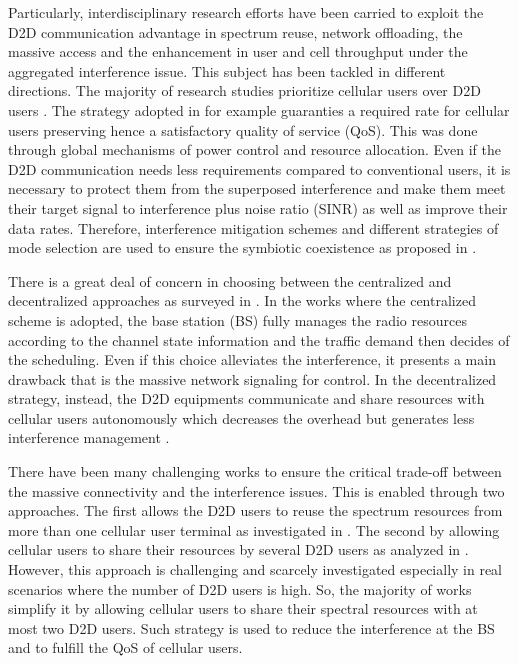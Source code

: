 \documentclass[conference,onecolumn,12pt]{IEEEtran}
\begin{document}
Particularly, interdisciplinary research efforts have been carried to exploit the D2D communication advantage in spectrum reuse, network offloading, the massive access and the enhancement in user and cell throughput under the aggregated interference issue. This subject has been tackled in different directions. The majority of research studies prioritize cellular users over D2D users \cite{D2DqosSurvey}. The strategy adopted in \cite{RateQos} for example guaranties a required rate for cellular users preserving hence a satisfactory quality of service (QoS). This was done through global mechanisms of power control and resource allocation. Even if the D2D communication needs less requirements compared to conventional users, it is necessary to protect them from the superposed interference and make them meet their target signal to interference plus noise ratio (SINR) as well as improve their data rates. Therefore, interference mitigation schemes and different strategies of mode selection are used to ensure the symbiotic coexistence as proposed in \cite{QoSD2D, mixedMode}.

There is a great deal of concern in choosing between the centralized and decentralized approaches as surveyed in \cite{D2DsurveyEkram}.
In the works where the centralized scheme is adopted, the base station (BS) fully manages the radio resources according to the channel state information and the traffic demand then decides of the scheduling. Even if this choice alleviates the interference, it presents a main drawback that is the massive network signaling for control. In the decentralized strategy, instead, the D2D equipments communicate and share resources with cellular users autonomously which decreases the overhead but generates less interference management \cite{energyWang, CentraliDecentakizD2D}.

There have been many challenging works to ensure the critical trade-off between the massive connectivity and the interference issues. This is enabled through two approaches. The first allows the D2D users to reuse the spectrum resources from more than one cellular user terminal as investigated in \cite{D2DmultiReuse,D2DmultiReuse2}. The second by allowing cellular users to share their resources by several D2D users as analyzed in \cite{energyWang,multisharing}. However, this approach is challenging and scarcely investigated especially in real scenarios where the number of D2D users is high. So, the majority of works simplify it by allowing cellular users to share their spectral resources with at most two D2D users. Such strategy is used to reduce the interference at the BS and to fulfill the QoS of cellular users.
\end{document}
